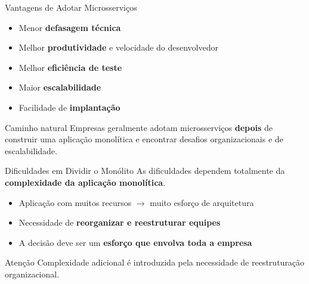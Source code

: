 \documentclass[aspectratio=169]{beamer}
\begin{document}
\begin{frame}{Vantagens de Adotar Microsserviços}
    \begin{itemize}
        \item Menor \textbf{defasagem técnica}
        \item Melhor \textbf{produtividade} e velocidade do desenvolvedor
        \item Melhor \textbf{eficiência de teste}
        \item Maior \textbf{escalabilidade}
        \item Facilidade de \textbf{implantação}
    \end{itemize}
    \vspace{0.4cm}
    \begin{block}{Caminho natural}
        Empresas geralmente adotam microsserviços \textbf{depois} de construir uma aplicação monolítica e encontrar desafios organizacionais e de escalabilidade.
    \end{block}
    \begin{center}
    \end{center}
\end{frame}

\begin{frame}{Dificuldades em Dividir o Monólito}
    As dificuldades dependem totalmente da \textbf{complexidade da aplicação monolítica}.
    \vspace{0.3cm}
    \begin{itemize}
        \item Aplicação com muitos recursos $\rightarrow$ muito esforço de arquitetura
        \item Necessidade de \textbf{reorganizar e reestruturar equipes}
        \item A decisão deve ser um \textbf{esforço que envolva toda a empresa}
    \end{itemize}
    \vspace{0.3cm}
    \begin{alertblock}{Atenção}
        Complexidade adicional é introduzida pela necessidade de reestruturação organizacional.
    \end{alertblock}
\end{frame}
\end{document}
